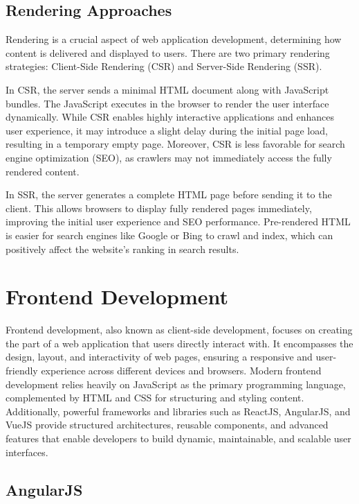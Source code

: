\vspace{1.5em}
\subsection*{Rendering Approaches}

Rendering is a crucial aspect of web application development, determining how content is delivered and displayed to users. There are two primary rendering strategies: Client-Side Rendering (CSR) and Server-Side Rendering (SSR).

In CSR, the server sends a minimal HTML document along with JavaScript bundles. The JavaScript executes in the browser to render the user interface dynamically. While CSR enables highly interactive applications and enhances user experience, it may introduce a slight delay during the initial page load, resulting in a temporary empty page. Moreover, CSR is less favorable for search engine optimization (SEO), as crawlers may not immediately access the fully rendered content.\cite{client_side_vs_server_side}

In SSR, the server generates a complete HTML page before sending it to the client. This allows browsers to display fully rendered pages immediately, improving the initial user experience and SEO performance. Pre-rendered HTML is easier for search engines like Google or Bing to crawl and index, which can positively affect the website’s ranking in search results.\cite{client_side_vs_server_side}

\section{Frontend Development}

Frontend development, also known as client-side development, focuses on creating the part of a web application that users directly interact with. It encompasses the design, layout, and interactivity of web pages, ensuring a responsive and user-friendly experience across different devices and browsers. Modern frontend development relies heavily on JavaScript as the primary programming language, complemented by HTML and CSS for structuring and styling content. Additionally, powerful frameworks and libraries such as ReactJS, AngularJS, and VueJS provide structured architectures, reusable components, and advanced features that enable developers to build dynamic, maintainable, and scalable user interfaces.

\subsection{AngularJS}

